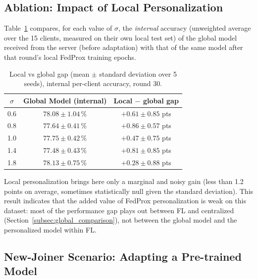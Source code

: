 \documentclass{article}
\begin{document}
\subsection{Ablation: Impact of Local Personalization}
\label{subsec:ablation_personalization}

Table~\ref{tab:ablation_b} compares, for each value of $\sigma$, the \emph{internal}
accuracy (unweighted average over the 15 clients, measured on their own local test
set) of the global model received from the server (before adaptation) with that
of the same model after that round's local FedProx training epochs.

\begin{table}[h!]
  \centering
  \caption{Local vs global gap (mean $\pm$ standard deviation over 5 seeds),
  internal per-client accuracy, round 30.}
  \label{tab:ablation_b}
  \begin{tabular}{ccc}
    \toprule
    $\sigma$ & Global Model (internal) & Local $-$ global gap \\
    \midrule
    0.6 & $78.08 \pm 1.04\,\%$ & $+0.61 \pm 0.85$ pts \\
    0.8 & $77.64 \pm 0.41\,\%$ & $+0.86 \pm 0.57$ pts \\
    1.0 & $77.75 \pm 0.42\,\%$ & $+0.47 \pm 0.75$ pts \\
    1.4 & $77.48 \pm 0.43\,\%$ & $+0.81 \pm 0.85$ pts \\
    1.8 & $78.13 \pm 0.75\,\%$ & $+0.28 \pm 0.88$ pts \\
    \bottomrule
  \end{tabular}
\end{table}

Local personalization brings here only a marginal and noisy gain (less than 1.2
points on average, sometimes statistically null given the standard deviation).
This result indicates that the added value of FedProx personalization is weak on
this dataset: most of the performance gap plays out between FL and centralized
(Section~\ref{subsec:global_comparison}), not between the global model and the
personalized model within FL.

\subsection{New-Joiner Scenario: Adapting a Pre-trained Model}
\label{subsec:late_joiner}
\end{document}
